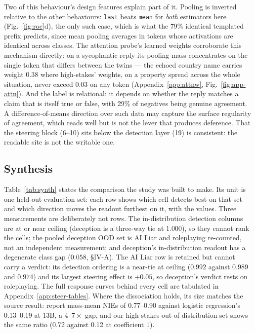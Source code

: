 \documentclass[conference]{IEEEtran}
\begin{document}
Two of this behaviour's design features explain part of it. Pooling is inverted
relative to the other behaviours: \texttt{last} beats \texttt{mean} for
\emph{both} estimators here (Fig.~\ref{fig:roc}d), the only such case, which is
what the 79\% identical templated prefix predicts, since mean pooling averages in
tokens whose activations are identical across classes. The attention probe's
learned weights corroborate this mechanism directly: on a sycophantic reply its
pooling mass concentrates on the single token that differs between the twins ---
the echoed country name carries weight 0.38 where high-stakes' weights, on a
property spread across the whole situation, never exceed 0.03 on any token
(Appendix~\ref{app:attnw}, Fig.~\ref{fig:app-attn}). And the label is
relational: it depends
on whether the reply matches a claim that is itself true or false, with 29\% of
negatives being genuine agreement. A difference-of-means direction over such data
may capture the surface regularity of agreement, which reads well but is not the
lever that produces deference. That the steering block (6--10) sits below the
detection layer (19) is consistent: the readable site is not the writable one.

\subsection{Synthesis}
Table~\ref{tab:synth} states the comparison the study was built to make. Its
unit is one held-out evaluation set: each row shows which cell detects best on
that set and which direction moves the readout furthest on it, with the values.
Three measurements are deliberately not rows. The in-distribution detection
columns are at or near ceiling (deception is a three-way tie at 1.000), so they
cannot rank the cells; the pooled deception OOD set is AI Liar and roleplaying
re-counted, not an independent measurement; and deception's in-distribution
readout has a degenerate class gap ($0.058$, §IV-A). The AI Liar row is
retained but cannot carry a verdict: its detection ordering is a near-tie at
ceiling ($0.992$ against $0.989$ and $0.974$) and its largest steering effect
is $+0.05$, so deception's verdict rests on roleplaying. The full response
curves behind every cell are tabulated in Appendix~\ref{app:steer-tables}.
Where the dissociation holds, its size matches the source result:
\citeauthor{marks2024} report mass-mean NIEs of 0.77--0.90 against
logistic regression's 0.13--0.19 at 13B, a $4$--$7\times$ gap, and our
high-stakes out-of-distribution set shows the same ratio (0.72 against 0.12
at coefficient $1$).
\end{document}
